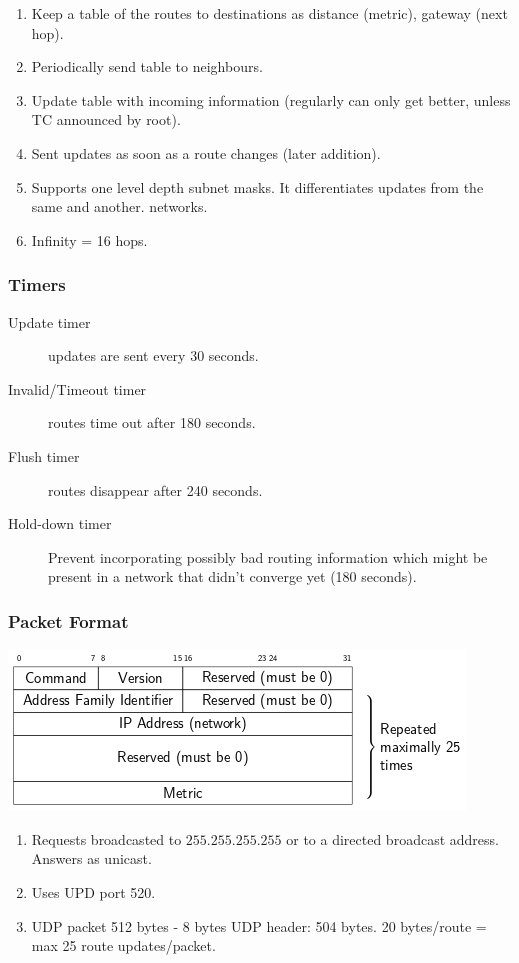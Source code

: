 \documentclass{article}
\begin{document}
\begin{enumerate}
	\item Keep a table of the routes to destinations as {distance (metric), gateway (next hop)}.
	\item Periodically send table to neighbours.
	\item Update table with incoming information (regularly can only get better, unless TC announced by root).
	\item Sent updates as soon as a route changes (later addition).
	\item Supports one level depth subnet masks. It differentiates updates from the same and another. networks.
	\item Infinity = 16 hops.
\end{enumerate}
	
\subsubsection{Timers}
	
\begin{description}
	\item[Update timer] updates are sent every 30 seconds.
	\item[Invalid/Timeout timer] routes time out after 180 seconds.
	\item[Flush timer] routes disappear after 240 seconds.
	\item[Hold-down timer] Prevent incorporating possibly bad routing information
which might be present in a network that didn’t converge yet (180 seconds).
\end{description}

\subsubsection{Packet Format}

\centerline{\includegraphics[scale=0.6]{images/RIPv1.png}\\[1cm]}

\begin{enumerate}
	\item Requests broadcasted to $255.255.255.255$ or to a directed broadcast address. Answers as unicast.
	\item Uses UPD port 520.
	\item UDP packet 512 bytes - 8 bytes UDP header: 504 bytes. 20 bytes/route = max 25 route updates/packet.
\end{enumerate}
\end{document}
